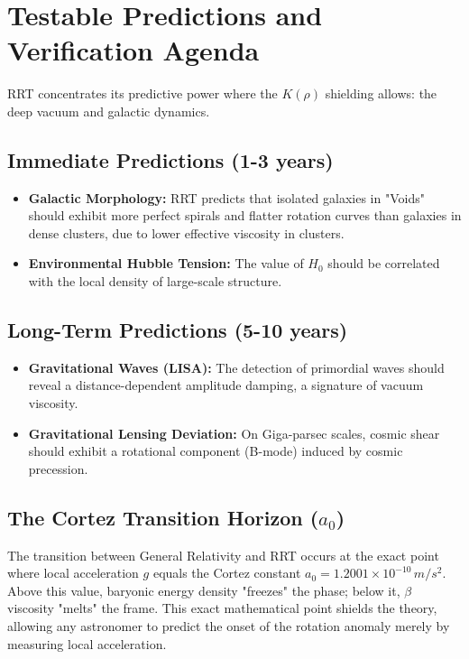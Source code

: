 \documentclass[12pt, a4paper]{article}
\begin{document}
\section{Testable Predictions and Verification Agenda}

RRT concentrates its predictive power where the $K(\rho)$ shielding allows: the deep vacuum and galactic dynamics.

\subsection{Immediate Predictions (1-3 years)}
\begin{itemize}
    \item \textbf{Galactic Morphology:} RRT predicts that isolated galaxies in "Voids" should exhibit more perfect spirals and flatter rotation curves than galaxies in dense clusters, due to lower effective viscosity in clusters.
    \item \textbf{Environmental Hubble Tension:} The value of $H_0$ should be correlated with the local density of large-scale structure.
\end{itemize}

\subsection{Long-Term Predictions (5-10 years)}
\begin{itemize}
    \item \textbf{Gravitational Waves (LISA):} The detection of primordial waves should reveal a distance-dependent amplitude damping, a signature of vacuum viscosity.
    \item \textbf{Gravitational Lensing Deviation:} On Giga-parsec scales, cosmic shear should exhibit a rotational component (B-mode) induced by cosmic precession.
\end{itemize}

\subsection{The Cortez Transition Horizon (\texorpdfstring{$a_0$}{a0})}
The transition between General Relativity and RRT occurs at the exact point where local acceleration $g$ equals the Cortez constant $a_0 = 1.2001 \times 10^{-10} \, m/s^2$. Above this value, baryonic energy density "freezes" the phase; below it, $\beta$ viscosity "melts" the frame. This exact mathematical point shields the theory, allowing any astronomer to predict the onset of the rotation anomaly merely by measuring local acceleration.
\end{document}
